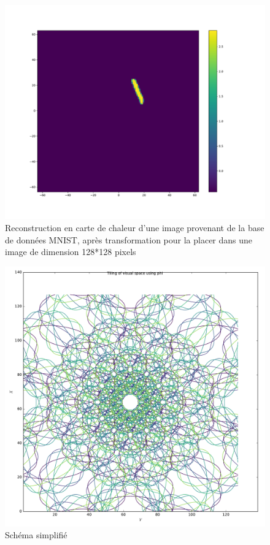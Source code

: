 \begin{figure}[th]
\centering
\includegraphics[scale=0.4]{Figures/MNIST_128}
\decoRule %
\caption[Figure]{Reconstruction en carte de chaleur d'une image provenant de la base de données MNIST, après transformation pour la placer dans une image de dimension 128*128 pixels}
\label{fig:MNIST_128}
\end{figure}

\begin{figure}[th]
\centering
\includegraphics[scale=0.4]{Figures/logpol_filter}
\decoRule %
\caption[Figure]{Schéma simplifié}
\label{fig:logpol_filter}
\end{figure}

